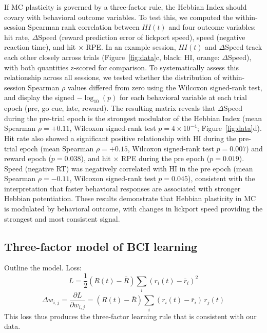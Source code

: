 \documentclass[
  journal=medium,
  manuscript=preprint,
  year=2026
]{aind-preprint}
\begin{document}
If MC plasticity is governed by a three-factor rule, the Hebbian Index should covary with behavioral outcome variables. To test this, we computed the within-session Spearman rank correlation between $HI(t)$ and four outcome variables: hit rate, $\Delta$Speed (reward prediction error of lickport speed), speed (negative reaction time), and hit $\times$ RPE. In an example session, $HI(t)$ and $\Delta$Speed track each other closely across trials (Figure~\ref{fig:data}c, black: HI, orange: $\Delta$Speed), with both quantities z-scored for comparison. To systematically assess this relationship across all sessions, we tested whether the distribution of within-session Spearman $\rho$ values differed from zero using the Wilcoxon signed-rank test, and display the signed $-\log_{10}(p)$ for each behavioral variable at each trial epoch (pre, go cue, late, reward). The resulting matrix reveals that $\Delta$Speed during the pre-trial epoch is the strongest modulator of the Hebbian Index (mean Spearman $\rho = +0.11$, Wilcoxon signed-rank test $p = 4 \times 10^{-4}$; Figure~\ref{fig:data}d). Hit rate also showed a significant positive relationship with HI during the pre-trial epoch (mean Spearman $\rho = +0.15$, Wilcoxon signed-rank test $p = 0.007$) and reward epoch ($p = 0.038$), and hit $\times$ RPE during the pre epoch ($p = 0.019$). Speed (negative RT) was negatively correlated with HI in the pre epoch (mean Spearman $\rho = -0.11$, Wilcoxon signed-rank test $p = 0.045$), consistent with the interpretation that faster behavioral responses are associated with stronger Hebbian potentiation. These results demonstrate that Hebbian plasticity in MC is modulated by behavioral outcome, with changes in lickport speed providing the strongest and most consistent signal.



\subsection{Three-factor model of BCI learning}
Outline the model.
Loss:
\begin{equation}
    L = \frac{1}{2}(R(t)-\bar{R})\sum_i (r_i(t) -\bar{r}_i)^2
\end{equation}
\begin{equation}
    \Delta w_{i,j} =\frac{\partial L}{\partial w_{i,j}} = (R(t)-\bar{R})\sum_i (r_i(t) -\bar{r}_i)\,r_{j}(t)
\end{equation}
This loss thus produces the three-factor learning rule that is consistent with our data.
\end{document}
